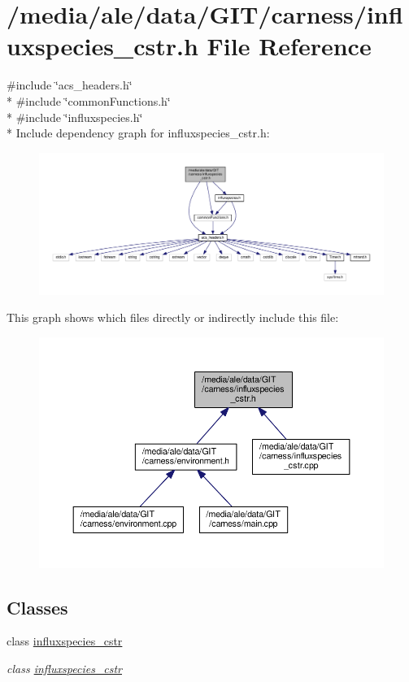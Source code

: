 \hypertarget{a00036}{\section{/media/ale/data/\-G\-I\-T/carness/influxspecies\-\_\-cstr.h File Reference}
\label{a00036}
}
{\ttfamily \#include \char`\"{}acs\-\_\-headers.\-h\char`\"{}}\\*
{\ttfamily \#include \char`\"{}common\-Functions.\-h\char`\"{}}\\*
{\ttfamily \#include \char`\"{}influxspecies.\-h\char`\"{}}\\*
Include dependency graph for influxspecies\-\_\-cstr.\-h\-:\nopagebreak
\begin{figure}[H]
\begin{center}
\leavevmode
\includegraphics[width=350pt]{a00068}
\end{center}
\end{figure}
This graph shows which files directly or indirectly include this file\-:\nopagebreak
\begin{figure}[H]
\begin{center}
\leavevmode
\includegraphics[width=350pt]{a00069}
\end{center}
\end{figure}
\subsection*{Classes}
\begin{DoxyCompactItemize}
\item 
class \hyperlink{a00014}{influxspecies\-\_\-cstr}
\begin{DoxyCompactList}\small\item\em class \hyperlink{a00014}{influxspecies\-\_\-cstr} \end{DoxyCompactList}\end{DoxyCompactItemize}
